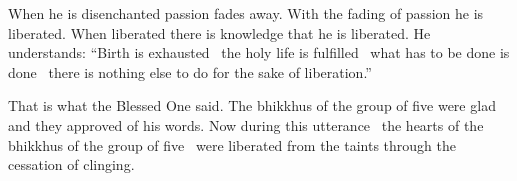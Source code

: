 \begin{english-only-hang}
When he is disenchanted passion fades away. With the fading of passion he is liberated. When liberated there is knowledge that he is liberated. He understands: ``Birth is exhausted \breathmark\ the holy life is fulfilled \breathmark\ what has to be done is done \breathmark\ there is nothing else to do for the sake of liberation.''\hyperlink{endnote111-appendix}{\hypertarget{endnote111-body}{}}
\end{english-only-hang}

\begin{english-only-hang}
  That is what the Blessed One said. The bhikkhus of the group of five were glad and they approved of his words. Now during this utterance \breathmark\ the hearts of the bhikkhus of the group of five \breathmark\ were liberated from the taints through the cessation of clinging.
\end{english-only-hang}

\suttaRef{[SN 22.59]}

